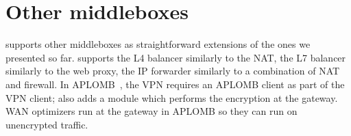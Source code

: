 
\section{Other middleboxes}\label{sec:vpn} \label{sec:other_apps} \label{sec:not_supp}\label{sec:loadb}

 \sys supports other middleboxes as straightforward extensions of the ones we presented so far. 
\sys supports the L4 balancer similarly to the NAT, the L7 balancer similarly to the web proxy, the IP forwarder similarly to a combination of NAT and firewall. 
In APLOMB~\cite{aplomb}, the VPN requires an APLOMB client as part of the VPN client; \sys also adds a module  which performs the encryption at the gateway. WAN optimizers run at the gateway in APLOMB so they can run on unencrypted traffic. 



%
%
%
%
%
%
%
%
%




